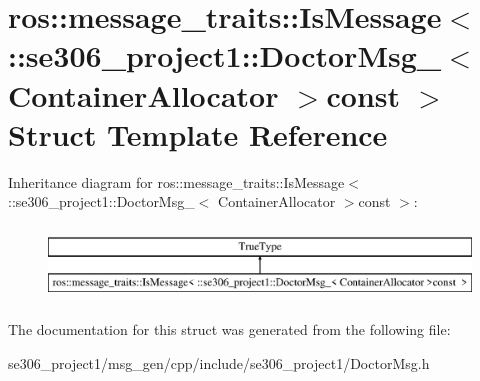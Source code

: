 \hypertarget{structros_1_1message__traits_1_1IsMessage_3_01_1_1se306__project1_1_1DoctorMsg___3_01ContainerAllocator_01_4const_01_01_4}{\section{ros\-:\-:message\-\_\-traits\-:\-:Is\-Message$<$ \-:\-:se306\-\_\-project1\-:\-:Doctor\-Msg\-\_\-$<$ Container\-Allocator $>$const $>$ Struct Template Reference}
\label{structros_1_1message__traits_1_1IsMessage_3_01_1_1se306__project1_1_1DoctorMsg___3_01ContainerAllocator_01_4const_01_01_4}
}
Inheritance diagram for ros\-:\-:message\-\_\-traits\-:\-:Is\-Message$<$ \-:\-:se306\-\_\-project1\-:\-:Doctor\-Msg\-\_\-$<$ Container\-Allocator $>$const $>$\-:\begin{figure}[H]
\begin{center}
\leavevmode
\includegraphics[height=2.000000cm]{structros_1_1message__traits_1_1IsMessage_3_01_1_1se306__project1_1_1DoctorMsg___3_01ContainerAllocator_01_4const_01_01_4}
\end{center}
\end{figure}


The documentation for this struct was generated from the following file\-:\begin{DoxyCompactItemize}
\item 
se306\-\_\-project1/msg\-\_\-gen/cpp/include/se306\-\_\-project1/Doctor\-Msg.\-h\end{DoxyCompactItemize}
